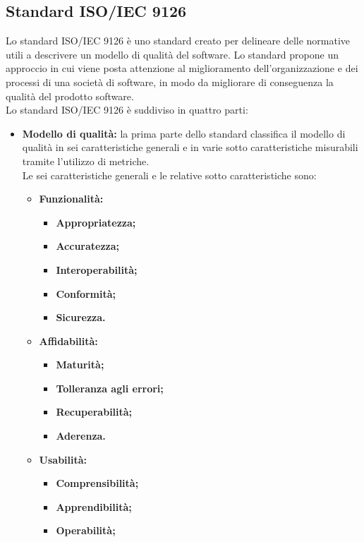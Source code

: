   	\subsection{Standard ISO/IEC 9126}
  	Lo standard ISO\gloss{}/IEC\gloss{} 9126 è uno standard creato per delineare delle normative utili a descrivere un modello di qualità del software. Lo standard propone un approccio in cui viene posta attenzione al miglioramento dell'organizzazione e dei processi di una società di software, in modo da migliorare di conseguenza la qualità del prodotto software.\\
  	Lo standard ISO\gloss{}/IEC\gloss{} 9126 è suddiviso in quattro parti:
		\begin{itemize}
			\item \textbf{Modello di qualità: } la prima parte dello standard classifica il modello di qualità in sei caratteristiche generali e in varie sotto caratteristiche misurabili tramite l'utilizzo di metriche.\\
			Le sei caratteristiche generali e le relative sotto caratteristiche sono:
				\begin{itemize}
					\item \textbf{Funzionalità:}
						\begin{itemize}
							\item \textbf{Appropriatezza;}
							\item \textbf{Accuratezza;}
							\item \textbf{Interoperabilità;}
							\item \textbf{Conformità;}
							\item \textbf{Sicurezza.}
						\end{itemize}
					\item \textbf{Affidabilità:}
						\begin{itemize}
							\item \textbf{Maturità;}
							\item \textbf{Tolleranza agli errori;}
							\item \textbf{Recuperabilità;}
							\item \textbf{Aderenza.}
						\end{itemize}
					\item \textbf{Usabilità:}
						\begin{itemize}
							\item \textbf{Comprensibilità;}
							\item \textbf{Apprendibilità;}
							\item \textbf{Operabilità;}

\end{itemize}
\end{itemize}
\end{itemize}
